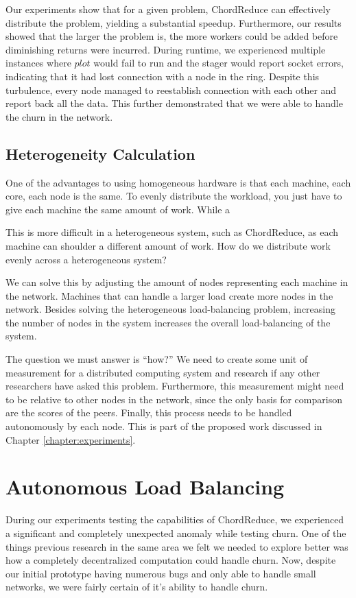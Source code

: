 Our experiments show that for a given problem, ChordReduce can effectively distribute the problem, yielding a substantial speedup.  
Furthermore, our results showed that the larger the problem is, the more workers could be added before diminishing returns were incurred.  
During runtime, we experienced multiple instances where $plot$ would fail to run and the stager would report socket errors, indicating that it had lost connection with a node in the ring.  Despite this turbulence, every node managed to reestablish connection with each other and report back all the data.  
This further demonstrated that we were able to handle the churn in the network.


\subsection{Heterogeneity Calculation}

One of the advantages to using homogeneous hardware is that each machine, each core, each node is the same.
To evenly distribute the workload, you just have to give each machine the same amount of work.
While a

This is more difficult in a heterogeneous system, such as ChordReduce, as each machine can shoulder a different amount of work.
How do we distribute work evenly across a heterogeneous system?

We can solve this by adjusting the amount of nodes representing each machine in the network.
Machines that can handle a larger load create more nodes in the network.
Besides solving the heterogeneous load-balancing problem, increasing the number of nodes in the system increases the overall load-balancing of the system.

The question we must answer is ``how?''
We need to create some unit of measurement for a distributed computing system and research if any other researchers have asked this problem.
Furthermore, this measurement might need to be relative to other nodes in the network, since the only basis for comparison are the scores of the peers. 
Finally, this process needs to be handled autonomously by each node.
This is part of the proposed work discussed in Chapter \ref{chapter:experiments}.
\section{Autonomous Load Balancing}
\label{sec:auto-load-bal}


During our experiments testing the capabilities of ChordReduce, we experienced a significant and completely unexpected anomaly while testing churn.
One of the things previous research \cite{marozzo2012p2p}  \cite{leemap} in the same area we felt we needed to explore better was how a completely decentralized computation could handle churn.
Now, despite our initial prototype having numerous bugs and only able to handle small networks, we were fairly certain of it's ability to handle churn.

